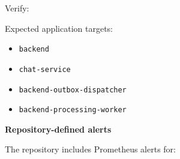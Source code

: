 Verify:

\begin{Shaded}
\begin{Highlighting}[]
  
\end{Highlighting}
\end{Shaded}

Expected application targets:

\begin{itemize}
\tightlist
\item
  \texttt{backend}
\item
  \texttt{chat-\allowbreak{}service}
\item
  \texttt{backend-\allowbreak{}outbox-\allowbreak{}dispatcher}
\item
  \texttt{backend-\allowbreak{}processing-\allowbreak{}worker}
\end{itemize}

\vspace{0.5em}\noindent\textbf{Repository-defined alerts}\par

The repository includes Prometheus alerts for:

